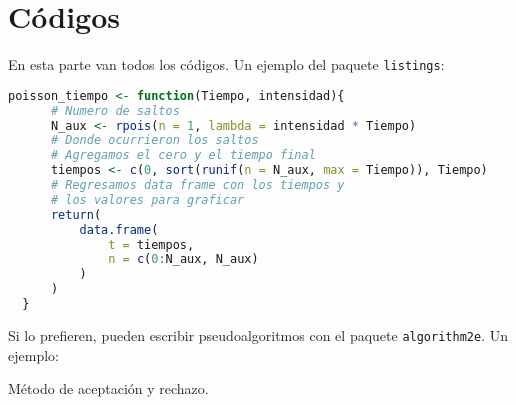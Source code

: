 \chapter{Códigos}

\noindent En esta parte van todos los códigos. Un ejemplo del paquete \texttt{listings}:

{\small
\begin{lstlisting}[language=R]
  poisson_tiempo <- function(Tiempo, intensidad){
      # Numero de saltos
      N_aux <- rpois(n = 1, lambda = intensidad * Tiempo)
      # Donde ocurrieron los saltos
      # Agregamos el cero y el tiempo final
      tiempos <- c(0, sort(runif(n = N_aux, max = Tiempo)), Tiempo)
      # Regresamos data frame con los tiempos y 
      # los valores para graficar
      return(
          data.frame(
              t = tiempos,
              n = c(0:N_aux, N_aux)
          )
      )
  }
\end{lstlisting}
}

Si lo prefieren, pueden escribir pseudoalgoritmos con el paquete \texttt{algorithm2e}. Un ejemplo:

\begin{algorithm}[htp]
  \caption{Método de aceptación y rechazo.}
\end{algorithm}